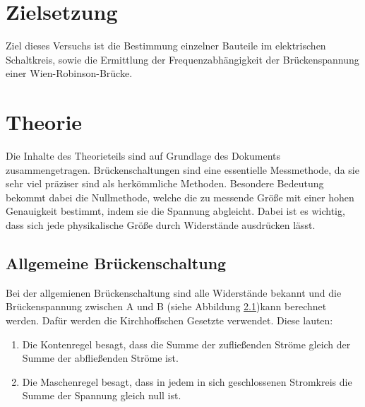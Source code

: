 \section{Zielsetzung}
Ziel dieses Versuchs ist die Bestimmung einzelner Bauteile im elektrischen Schaltkreis,
sowie die Ermittlung der Frequenzabhängigkeit der Brückenspannung einer Wien-Robinson-Brücke.

\section{Theorie}
\label{sec:Theorie}
Die Inhalte des Theorieteils sind auf Grundlage des Dokuments \cite{V302_Anleitung} zusammengetragen.
Brückenschaltungen sind eine essentielle Messmethode, da sie sehr viel präziser sind als herkömmliche Methoden.
Besondere Bedeutung bekommt dabei die Nullmethode, welche die zu messende Größe mit einer hohen Genauigkeit bestimmt,
indem sie die Spannung abgleicht.
Dabei ist es wichtig, dass sich jede physikalische Größe durch Widerstände ausdrücken lässt.
\subsection{Allgemeine Brückenschaltung}
Bei der allgemienen Brückenschaltung sind alle Widerstände bekannt und die Brückenspannung zwischen A und B (siehe
Abbildung \ref{})kann berechnet werden.
Dafür werden die Kirchhoffschen Gesetzte verwendet.
Diese lauten:
\begin{enumerate}
    \item Die Kontenregel besagt, dass die Summe der zufließenden Ströme gleich der Summe der abfließenden Ströme ist.
    \item Die Maschenregel besagt, dass in jedem in sich geschlossenen Stromkreis die Summe der Spannung gleich null ist.
\end{enumerate}




